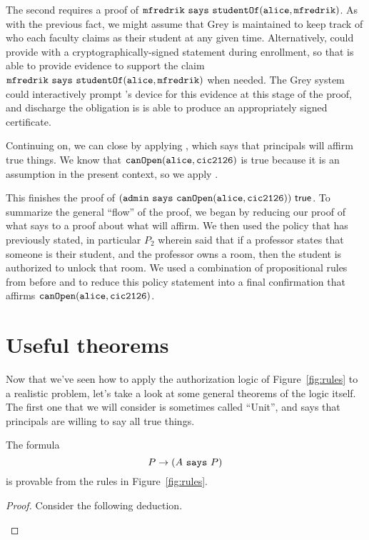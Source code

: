 \documentclass[11pt,twoside]{scrartcl}
\begin{document}
The second requires a proof of $\texttt{\upshape mfredrik}~\texttt{\upshape says}~\texttt{\upshape studentOf}(\texttt{\upshape alice},\texttt{\upshape mfredrik})$.
As with the previous fact, we might assume that Grey is maintained to keep track of who each faculty claims as their student at any given time.
Alternatively, \matt could provide \tli with a cryptographically-signed statement during enrollment, so that \tli is able to provide evidence to support the claim $\texttt{\upshape mfredrik}~\texttt{\upshape says}~\texttt{\upshape studentOf}(\texttt{\upshape alice},\texttt{\upshape mfredrik})$ when needed.
The Grey system could interactively prompt \tli's device for this evidence at this stage of the proof, and discharge the obligation is \tli is able to produce an appropriately signed certificate. 

Continuing on, we can close by applying , which says that principals will affirm true things. We know that $\texttt{\upshape canOpen}(\texttt{\upshape alice},\texttt{\upshape cic2126})$ is true because it is an assumption in the present context, so we apply .
\begin{sequentdeduction}[array]
 {
}
\end{sequentdeduction}
This finishes the proof of $(\texttt{\upshape admin}~\texttt{\upshape says}~\texttt{\upshape canOpen}(\texttt{\upshape alice},\texttt{\upshape cic2126}))~\mathsf{true}$. To summarize the general ``flow'' of the proof, we began by reducing our proof of what \admin says to a proof about what \admin will affirm. We then used the policy that \admin has previously stated, in particular $P_2$ wherein \admin said that if a professor states that someone is their student, and the professor owns a room, then the student is authorized to unlock that room. We used a combination of propositional rules from before and  to reduce this policy statement into a final confirmation that \admin affirms $\texttt{\upshape canOpen}(\texttt{\upshape alice},\texttt{\upshape cic2126})$.

\section{Useful theorems}

Now that we've seen how to apply the authorization logic of Figure~\ref{fig:rules} to a realistic problem, let's take a look at some general theorems of the logic itself. The first one that we will consider is sometimes called ``Unit'', and says that principals are willing to say all true things.

\begin{theorem}[Unit]
The formula
\[
P \rightarrow (A~\texttt{\upshape says}~P)
\]
is provable from the rules in Figure~\ref{fig:rules}.
\end{theorem}
\begin{proof}
Consider the following deduction.
\begin{sequentdeduction}[array]
 {
}
\end{sequentdeduction}
\end{proof}
\end{document}
